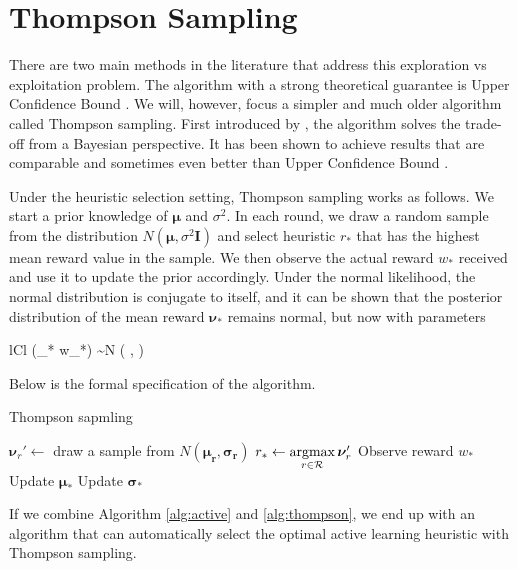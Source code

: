 \section{Thompson Sampling}
There are two main methods in the literature that address this exploration vs exploitation 
problem. The algorithm with a strong theoretical guarantee is Upper Confidence Bound
\cite{auer02}. We will, however, focus a simpler and much older algorithm called Thompson sampling.
First introduced by , the algorithm solves the trade-off from
a Bayesian perspective. It has been shown to achieve results
that are comparable and sometimes even better than Upper Confidence Bound \cite{chapelle11}.

Under the heuristic selection setting, Thompson sampling works as follows.
We start a prior knowledge of $\bm{\mu}$ and $\sigma^2$. In each
round, we draw a random sample from the distribution $N(\bm{\mu}, \sigma^2 \bm{I})$
and select heuristic $r_*$ that has the highest mean reward value in the sample. We then 
observe the actual reward $w_{*}$ received and use it to update the prior accordingly.
Under the normal likelihood, the normal distribution is conjugate to itself, and it can be
shown that the posterior distribution of the mean reward $\bm{\nu}_{*}$
remains normal, but now with parameters
	\begin{IEEEeqnarray*}{lCl}
		(\bm{\nu}_{*} \mid w_{*}) \sim N \left(
		,
		\frac{\bm{\sigma}_* \bm{\tau}_*}{\bm{\tau}_* + \bm{\sigma}_*}
		\right)
	\end{IEEEeqnarray*}
Below is the formal specification of the algorithm.

\begin{algorithm}[h]
	\caption{Thompson sapmling}
	\label{alg:thompson}
	\begin{algorithmic}[1]
		\State $\bm{\nu}_r' \leftarrow$ draw a sample from $N(\bm{\mu_r}, \bm{\sigma_r})$
		\Endforeach
		\State $r_* \leftarrow \argmax_{r \in \R}\bm{\nu}_r'$
		\State Observe reward $w_{*}$
		\State Update $\bm{\mu}_{*}$
		\State Update $\bm{\sigma}_{*}$
		\Endforeach
		\EndProcedure
	\end{algorithmic}
\end{algorithm}

If we combine Algorithm \ref{alg:active} and \ref{alg:thompson}, we end up with
an algorithm that can automatically select the optimal active learning heuristic
with Thompson sampling.

